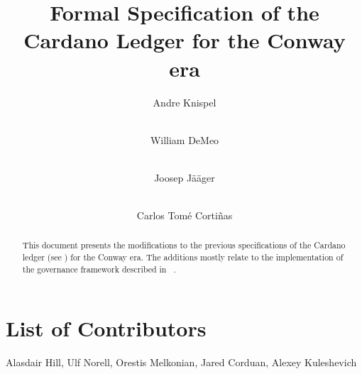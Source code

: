 \documentclass[11pt,a4paper,dvipsnames]{article}
\begin{document}
\title{Formal Specification of the Cardano Ledger for the Conway era}

\author{
   Andre Knispel \\ {\small {}} \\
   \and
   William DeMeo \\ {\small {}} \\
   \and
   Joosep Jääger \\ {\small {}} \\
   \and
   Carlos Tom\'{e} Corti\~{n}as \\ {\small {}}
}

\date{}

\maketitle

\begin{abstract}
  This document presents the modifications to the previous
  specifications of the Cardano ledger (see
  \cite{shelley-ledger-spec,shelley-ma-ledger-spec,alonzo-ledger-spec,babbage-ledger-spec})
  for the Conway era.  The additions mostly relate to the implementation of the governance
  framework described in ~\parencite{cip1694}.
\end{abstract}

\section*{List of Contributors}
\label{acknowledgements}

Alasdair Hill, Ulf Norell, Orestis Melkonian, Jared Corduan, Alexey Kuleshevich

\tableofcontents

\clearpage

















\clearpage

\printbibliography

\clearpage

\appendix




\end{document}
